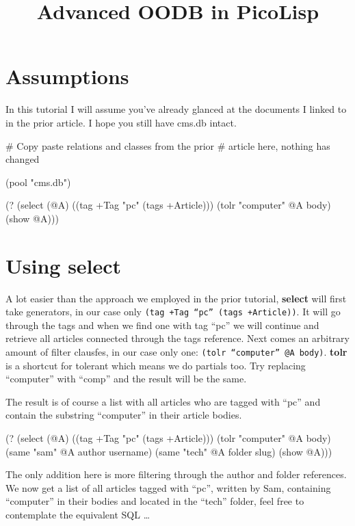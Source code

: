 \title{Advanced OODB in PicoLisp}

\maketitle

\section{Assumptions}
\label{sec:advanced-oodb}

In this tutorial I will assume you've already glanced at the documents I
linked to in the prior article. I hope you still have cms.db intact.


\begin{wideverbatim}
# Copy paste relations and classes from the prior 
# article here, nothing has changed

(pool "cms.db")

(? 
 (select (@A) 
         ((tag +Tag "pc" (tags +Article)))
         (tolr "computer" @A body) 
 (show @A)))
\end{wideverbatim}

\section{Using select}
\label{sec:advanced-oodb}

A lot easier than the approach we employed in the prior tutorial,
\textbf{select} will first take generators, in our case only
\texttt{(tag +Tag ``pc'' (tags +Article))}. It will go through the
tags and when we find one with tag ``pc'' we will continue and
retrieve all articles connected through the tags reference. Next comes
an arbitrary amount of filter clausfes, in our case only one: \texttt{(tolr
``computer'' @A body)}. \textbf{tolr} is a shortcut for tolerant which
means we do partials too. Try replacing ``computer'' with ``comp'' and
the result will be the same.

The result is of course a list with all articles who are tagged with
``pc'' and contain the substring ``computer'' in their article bodies.

\begin{wideverbatim}
(? 
 (select (@A) 
         ((tag +Tag "pc" (tags +Article)))
         (tolr "computer" @A body)
         (same "sam" @A author username)
         (same "tech" @A folder slug)
 (show @A)))
\end{wideverbatim}

The only addition here is more filtering through the author and folder
references. We now get a list of all articles tagged with ``pc'', written
by Sam, containing ``computer'' in their bodies and located in the ``tech''
folder, feel free to contemplate the equivalent SQL \dots{}

